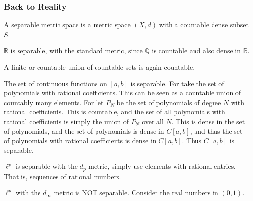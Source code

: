 \documentclass[crop=false,class=article,oneside]{standalone}
\begin{document}
        \subsubsection{Back to Reality}
            \begin{definition}
                A separable metric space
                is a metric space $(X,d)$ with
                a countable dense subset $S$.
            \end{definition}
            \begin{example}
                $\mathbb{R}$ is separable, with
                the standard metric, since
                $\mathbb{Q}$ is countable and also
                dense in $\mathbb{R}$.
            \end{example}
            \begin{theorem}
                A finite or countable union
                of countable sets is again countable.
            \end{theorem}
            \begin{example}
                The set of continuous functions on
                $[a,b]$ is separable. For
                take the set of polynomials with
                rational coefficients. This can
                be seen as a countable union of
                countably many elements. For let
                $P_{N}$ be the set of polynomials
                of degree $N$ with rational
                coefficients. This is countable,
                and the set of all polynomials with
                rational coefficients is simply the
                union of $P_{N}$ over all $N$. This
                is dense in the set of polynomials,
                and the set of polynomials is dense
                in $C[a,b]$, and thus
                the set of polynomials with rational
                coefficients is dense in $C[a,b]$. Thus
                $C[a,b]$ is separable.
            \end{example}
            \begin{example}
                $\ell^{p}$ is separable with the
                $d_{p}$ metric, simply use elements
                with rational entries. That is,
                sequences of rational numbers.
            \end{example}
            \begin{example}
                $\ell^{p}$ with the $d_{\infty}$ metric
                is NOT separable. Consider the real
                numbers in $(0,1)$.
            \end{example}
\end{document}
